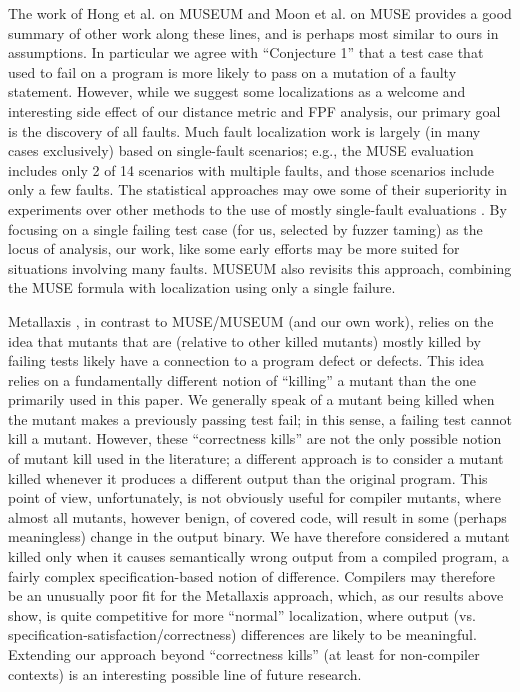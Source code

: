 The work of Hong et al. \cite{multilingual} on MUSEUM and Moon et al. \cite{MUSE} on MUSE provides a good summary of other work along these lines, and is perhaps most similar to ours in assumptions. In particular we agree with ``Conjecture 1'' that a test case that used to fail on a program is more likely to pass on a mutation of a faulty statement.  However, while we suggest some localizations as a welcome and interesting side effect of our distance metric and FPF analysis, our primary goal is the discovery of all faults. Much fault localization work is largely (in many cases exclusively) based on single-fault scenarios; e.g., the MUSE \cite{MUSE} evaluation includes only 2 of 14 scenarios with multiple faults, and those scenarios include only a few faults.   The statistical approaches may owe some of their superiority in experiments over other methods to the use of mostly single-fault evaluations \cite{Jones05}.  By focusing on a single failing test case (for us, selected by fuzzer taming) as the locus of analysis, our work, like some early efforts \cite{NearNeighbor,Cleve05,GroceError} may be more suited for situations involving many faults.  MUSEUM \cite{multilingual} also revisits this approach, combining the MUSE formula with localization using only a single failure.

Metallaxis \cite{Metallaxis,MetalSelect,Papadakis}, in contrast to MUSE/MUSEUM (and our own work), relies on the idea that mutants that are (relative to other killed mutants) mostly killed by failing tests likely have a connection to a program defect or defects.  This idea relies on a fundamentally different notion of ``killing'' a mutant than the one primarily used in this paper.  We generally speak of a mutant being killed when the mutant makes a previously passing test fail; in this sense, a failing test cannot kill a mutant.  However, these ``correctness kills'' are not the only possible notion of mutant kill used in the literature; a different approach is to consider a mutant killed whenever it produces a different output than the original program.  This point of view, unfortunately, is not obviously useful for compiler mutants, where almost all mutants, however benign, of covered code, will result in some (perhaps meaningless) change in the output binary.  We have therefore considered a mutant killed only when it causes semantically wrong output from a compiled program, a fairly complex specification-based notion of difference.  Compilers may therefore be an unusually poor fit for the Metallaxis approach, which, as our results above show, is quite competitive for more ``normal'' localization, where output (vs. specification-satisfaction/correctness) differences are likely to be meaningful.  Extending our approach beyond ``correctness kills'' (at least for non-compiler contexts) is an interesting possible line of future research.

